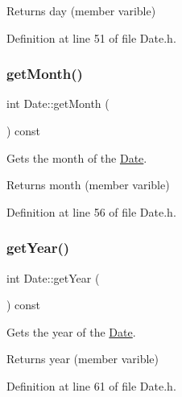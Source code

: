 \begin{DoxyReturn}{Returns}
day (member varible) 
\end{DoxyReturn}


Definition at line 51 of file Date.\+h.

\hypertarget{class_date_a332f6e3a2f6a40d73742b6dab7be0f64}{}\label{class_date_a332f6e3a2f6a40d73742b6dab7be0f64} 
\subsubsection{\texorpdfstring{get\+Month()}{getMonth()}}
{\footnotesize\ttfamily int Date\+::get\+Month (\begin{DoxyParamCaption}{ }\end{DoxyParamCaption}) const\hspace{0.3cm}{\ttfamily [inline]}}



Gets the month of the \hyperlink{class_date}{Date}. 

\begin{DoxyReturn}{Returns}
month (member varible) 
\end{DoxyReturn}


Definition at line 56 of file Date.\+h.

\hypertarget{class_date_a8b0869f34c2b38d108ab83ee2e770e5d}{}\label{class_date_a8b0869f34c2b38d108ab83ee2e770e5d} 
\subsubsection{\texorpdfstring{get\+Year()}{getYear()}}
{\footnotesize\ttfamily int Date\+::get\+Year (\begin{DoxyParamCaption}{ }\end{DoxyParamCaption}) const\hspace{0.3cm}{\ttfamily [inline]}}



Gets the year of the \hyperlink{class_date}{Date}. 

\begin{DoxyReturn}{Returns}
year (member varible) 
\end{DoxyReturn}


Definition at line 61 of file Date.\+h.

\hypertarget{class_date_a23dcdfa5167af68543c2b1cd7bb0360f}{}\label{class_date_a23dcdfa5167af68543c2b1cd7bb0360f} 
